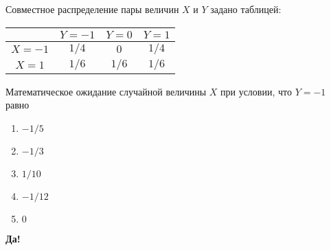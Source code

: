 \documentclass[t]{beamer}
\begin{document}
 \begin{frame} \label{13-Yes} 
\begin{block}{13} 

Совместное распределение пары величин $X$ и $Y$ задано таблицей:
\begin{center}
\begin{tabular}{@{}c|ccc@{}}
\toprule
       & $Y=-1$ & $Y=0$ & $Y=1$ \\ \midrule
$X=-1$ & $1/4$  & $0$   & $1/4$ \\
$X=1$  & $1/6$  & $1/6$ & $1/6$ \\ \bottomrule
\end{tabular}
\end{center}
\vspace{0.5cm} 
 
 
Математическое ожидание случайной величины $X$ при условии, что $Y=-1$ равно
 


 \end{block} 
\begin{enumerate} 
\item[] \hyperlink{13-Yes}{\beamergotobutton{} $-1/5$}
\item[] \hyperlink{13-No}{\beamergotobutton{} $-1/3$}
\item[] \hyperlink{13-No}{\beamergotobutton{} $1/10$
}
\item[] \hyperlink{13-No}{\beamergotobutton{} $-1/12$}
\item[] \hyperlink{13-No}{\beamergotobutton{} $0$}
\end{enumerate} 

 \textbf{Да!} 
 \hyperlink{14}{}\end{frame} 
\end{document}
